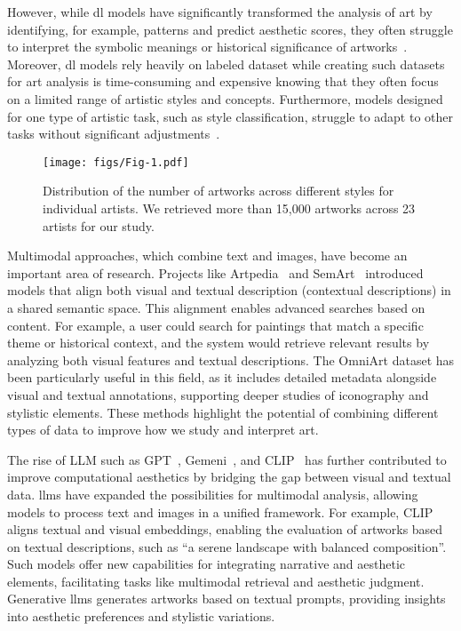 However, while \gls{dl} models have significantly transformed the analysis of art by identifying, for example, patterns and predict aesthetic scores, they often struggle to interpret the symbolic meanings or historical significance of artworks~\cite{cetinic2022understanding}. Moreover, \gls{dl} models rely heavily on labeled dataset while creating such datasets for art analysis is time-consuming and expensive knowing that they often focus on a limited range of artistic styles and concepts. Furthermore, models designed for one type of artistic task, such as style classification, struggle to adapt to other tasks without significant adjustments~\cite{cetinic2022understanding,elgammal2018shape}.
\begin{figure*}[!ht] %
    \centering
    \texttt{[image: figs/Fig-1.pdf]}
    \caption{Distribution of the number of artworks across different styles for individual artists. We retrieved more than 15,000 artworks across 23 artists for our study.}
    \label{fig:fig1}
\end{figure*}
Multimodal approaches, which combine text and images, have become an important area of research. Projects like Artpedia~\cite{stefanini2019artpedia} and SemArt~\cite{garcia2018read} introduced models that align both visual and textual description (contextual descriptions)  in a shared semantic space. 
This alignment enables advanced searches based on content. %
For example, a user could search for paintings that match a specific theme or historical context, and the system would retrieve relevant results by analyzing both visual features and textual descriptions. The OmniArt dataset has been particularly useful in this field, as it includes detailed metadata alongside visual and textual annotations, supporting deeper studies of iconography and stylistic elements. These methods highlight the potential of combining different types of data to improve how we study and interpret art.

The rise of LLM such as GPT~\cite{brown2020language},  Gemeni~\cite{team2023gemini}, and CLIP~\cite{radford2021learning} has further contributed to improve computational aesthetics by bridging the gap between visual and textual data. \glspl{llm} have expanded the possibilities for multimodal analysis, allowing models to process text and images in a unified framework. For example, CLIP aligns textual and visual embeddings, enabling the evaluation of artworks based on textual descriptions, such as ``a serene landscape with balanced composition''. Such models offer new capabilities for integrating narrative and aesthetic elements, facilitating tasks like multimodal retrieval and aesthetic judgment.  Generative \glspl{llm}\cite{reddy2021dall,10380595} generates artworks based on textual prompts, providing insights into aesthetic preferences and stylistic variations.

